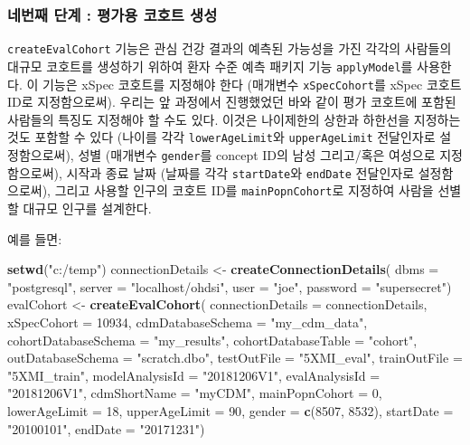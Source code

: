 \documentclass[11pt]{book}
\newenvironment{Shaded}{\begin{snugshade}}{\end{snugshade}}
\newcommand{\KeywordTok}[1]{\textcolor[rgb]{0.13,0.29,0.53}{\textbf{#1}}}
\newcommand{\DataTypeTok}[1]{\textcolor[rgb]{0.13,0.29,0.53}{#1}}
\newcommand{\DecValTok}[1]{\textcolor[rgb]{0.00,0.00,0.81}{#1}}
\newcommand{\StringTok}[1]{\textcolor[rgb]{0.31,0.60,0.02}{#1}}
\newcommand{\NormalTok}[1]{#1}
\theoremstyle{definition}
\theoremstyle{definition}
\theoremstyle{definition}
\theoremstyle{remark}
\begin{document}
\subsubsection*{네번째 단계 : 평가용 코호트 생성}\label{----}

\texttt{createEvalCohort} 기능은 관심 건강 결과의 예측된 가능성을 가진
각각의 사람들의 대규모 코호트를 생성하기 위하여 환자 수준 예측 패키지
기능 \texttt{applyModel}를 사용한다. 이 기능은 xSpec 코호트를 지정해야
한다 (매개변수 \texttt{xSpecCohort}를 xSpec 코호트 ID로 지정함으로써).
우리는 앞 과정에서 진행했었던 바와 같이 평가 코호트에 포함된 사람들의
특징도 지정해야 할 수도 있다. 이것은 나이제한의 상한과 하한선을 지정하는
것도 포함할 수 있다 (나이를 각각 \texttt{lowerAgeLimit}와
\texttt{upperAgeLimit} 전달인자로 설정함으로써), 성별 (매개변수
\texttt{gender}를 concept ID의 남성 그리고/혹은 여성으로 지정함으로써),
시작과 종료 날짜 (날짜를 각각 \texttt{startDate}와 \texttt{endDate}
전달인자로 설정함으로써), 그리고 사용할 인구의 코호트 ID를
\texttt{mainPopnCohort}로 지정하여 사람을 선별할 대규모 인구를 설계한다.

예를 들면:

\begin{Shaded}
\begin{Highlighting}[]
\KeywordTok{setwd}\NormalTok{(}\StringTok{"c:/temp"}\NormalTok{)}
\NormalTok{connectionDetails <-}\StringTok{ }\KeywordTok{createConnectionDetails}\NormalTok{(}
  \DataTypeTok{dbms =} \StringTok{"postgresql"}\NormalTok{,}
  \DataTypeTok{server =} \StringTok{"localhost/ohdsi"}\NormalTok{,}
  \DataTypeTok{user =} \StringTok{"joe"}\NormalTok{,}
  \DataTypeTok{password =} \StringTok{"supersecret"}\NormalTok{)}
\NormalTok{evalCohort <-}\StringTok{ }\KeywordTok{createEvalCohort}\NormalTok{(}
  \DataTypeTok{connectionDetails =}\NormalTok{ connectionDetails,}
  \DataTypeTok{xSpecCohort =} \DecValTok{10934}\NormalTok{,}
  \DataTypeTok{cdmDatabaseSchema =} \StringTok{"my_cdm_data"}\NormalTok{,}
  \DataTypeTok{cohortDatabaseSchema =} \StringTok{"my_results"}\NormalTok{,}
  \DataTypeTok{cohortDatabaseTable =} \StringTok{"cohort"}\NormalTok{,}
  \DataTypeTok{outDatabaseSchema =} \StringTok{"scratch.dbo"}\NormalTok{,}
  \DataTypeTok{testOutFile =} \StringTok{"5XMI_eval"}\NormalTok{,}
  \DataTypeTok{trainOutFile =} \StringTok{"5XMI_train"}\NormalTok{,}
  \DataTypeTok{modelAnalysisId =} \StringTok{"20181206V1"}\NormalTok{,}
  \DataTypeTok{evalAnalysisId =} \StringTok{"20181206V1"}\NormalTok{,}
  \DataTypeTok{cdmShortName =} \StringTok{"myCDM"}\NormalTok{,}
  \DataTypeTok{mainPopnCohort =} \DecValTok{0}\NormalTok{,}
  \DataTypeTok{lowerAgeLimit =} \DecValTok{18}\NormalTok{,}
  \DataTypeTok{upperAgeLimit =} \DecValTok{90}\NormalTok{,}
  \DataTypeTok{gender =} \KeywordTok{c}\NormalTok{(}\DecValTok{8507}\NormalTok{, }\DecValTok{8532}\NormalTok{),}
  \DataTypeTok{startDate =} \StringTok{"20100101"}\NormalTok{,}
  \DataTypeTok{endDate =} \StringTok{"20171231"}\NormalTok{)}
\end{Highlighting}
\end{Shaded}
\end{document}
